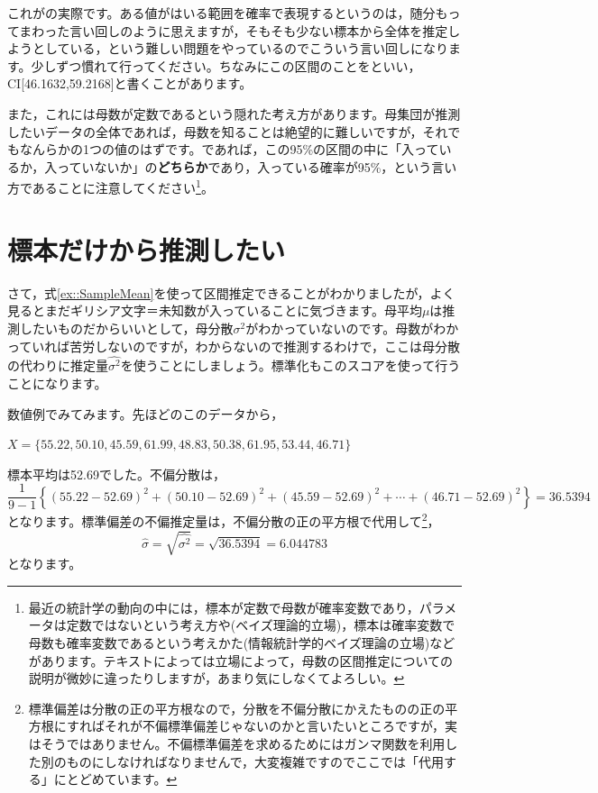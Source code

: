 \documentclass{ltjsbook}
\begin{document}
これがの実際です。ある値がはいる範囲を確率で表現するというのは，随分もってまわった言い回しのように思えますが，そもそも少ない標本から全体を推定しようとしている，という難しい問題をやっているのでこういう言い回しになります。少しずつ慣れて行ってください。ちなみにこの区間のことをといい，CI[46.1632,59.2168]と書くことがあります。


また，これには母数が定数であるという隠れた考え方があります。母集団が推測したいデータの全体であれば，母数を知ることは絶望的に難しいですが，それでもなんらかの1つの値のはずです。であれば，この95\%の区間の中に「入っているか，入っていないか」の\textbf{どちらか}であり，入っている確率が95\%，という言い方であることに注意してください\footnote{最近の統計学の動向の中には，標本が定数で母数が確率変数であり，パラメータは定数ではないという考え方や(ベイズ理論的立場)，標本は確率変数で母数も確率変数であるという考えかた(情報統計学的ベイズ理論の立場)などがあります。テキストによっては立場によって，母数の区間推定についての説明が微妙に違ったりしますが，あまり気にしなくてよろしい。}。

\section{標本だけから推測したい}
さて，式\ref{ex::SampleMean}を使って区間推定できることがわかりましたが，よく見るとまだギリシア文字＝未知数が入っていることに気づきます。母平均$\mu$は推測したいものだからいいとして，母分散$\sigma^2$がわかっていないのです。母数がわかっていれば苦労しないのですが，わからないので推測するわけで，ここは母分散の代わりに推定量$\hat{\sigma^2}$を使うことにしましょう。標準化もこのスコアを使って行うことになります。

数値例でみてみます。先ほどのこのデータから，
\begin{tcolorbox}
	$X = \{ 55.22, 50.10, 45.59, 61.99, 48.83, 50.38, 61.95, 53.44, 46.71\}$
\end{tcolorbox}
標本平均は52.69でした。不偏分散は，
\[ \frac{1}{9-1}\left\{ (55.22-52.69)^2+(50.10-52.69)^2+(45.59-52.69)^2+\cdots+(46.71-52.69)^2 \right\}=36.5394\]
となります。標準偏差の不偏推定量は，不偏分散の正の平方根で代用して\footnote{標準偏差は分散の正の平方根なので，分散を不偏分散にかえたものの正の平方根にすればそれが不偏標準偏差じゃないのかと言いたいところですが，実はそうではありません。不偏標準偏差を求めるためにはガンマ関数を利用した別のものにしなければなりませんで，大変複雑ですのでここでは「代用する」にとどめています。}，
\[ \hat{\sigma}=\sqrt{\hat{\sigma^2}}= \sqrt{36.5394}=6.044783 \]
となります。
\end{document}
